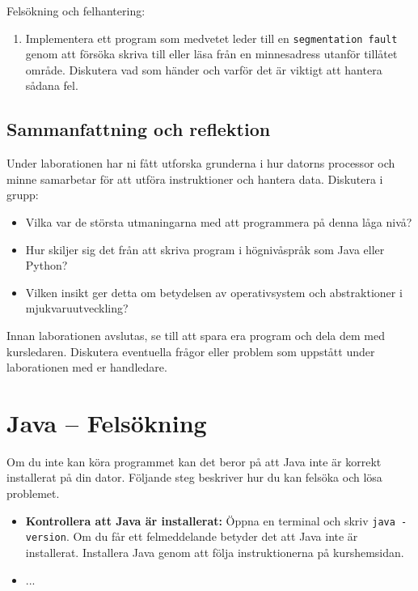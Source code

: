 \begin{Datorarbete}
    \item Felsökning och felhantering:
    \begin{enumerate}
        \item Implementera ett program som medvetet leder till en \texttt{segmentation fault} genom att försöka skriva till eller läsa från en minnesadress utanför tillåtet område. Diskutera vad som händer och varför det är viktigt att hantera sådana fel.
    \end{enumerate}
\end{Datorarbete}

\subsection*{Sammanfattning och reflektion}
Under laborationen har ni fått utforska grunderna i hur datorns processor och minne samarbetar för att utföra instruktioner och hantera data. Diskutera i grupp:
\begin{itemize}
    \item Vilka var de största utmaningarna med att programmera på denna låga nivå?
    \item Hur skiljer sig det från att skriva program i högnivåspråk som Java eller Python?
    \item Vilken insikt ger detta om betydelsen av operativsystem och abstraktioner i mjukvaruutveckling?
\end{itemize}

Innan laborationen avslutas, se till att spara era program och dela dem med kursledaren. Diskutera eventuella frågor eller problem som uppstått under laborationen med er handledare.



\newpage

\section{Java -- Felsökning}
\label{sec:java_troubleshoot}

Om du inte kan köra \progname programmet kan det beror på att Java inte är korrekt installerat på din dator. Följande steg beskriver hur du kan felsöka och lösa problemet.

\begin{itemize}
    \item \textbf{Kontrollera att Java är installerat:} Öppna en terminal och skriv \texttt{java -version}. Om du får ett felmeddelande betyder det att Java inte är installerat. Installera Java genom att följa instruktionerna på kurshemsidan.
    \item ...
\end{itemize}